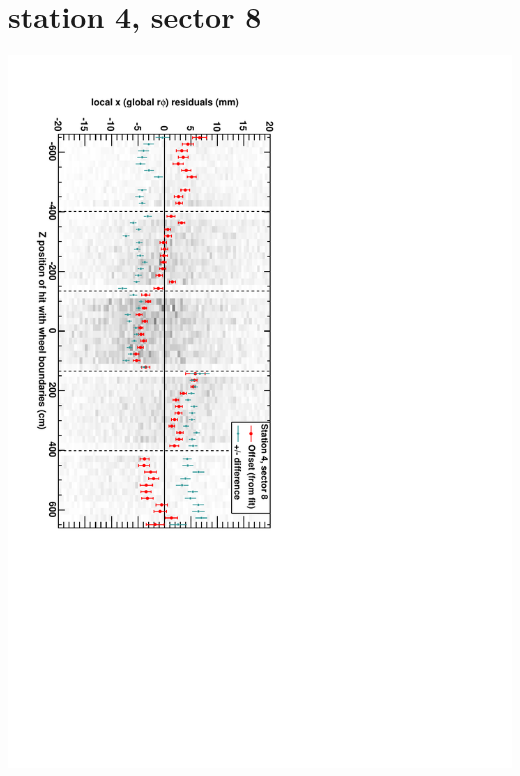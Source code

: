 \documentclass[compress]{beamer}
\begin{document}
\section*{station 4, sector 8}
\begin{frame} \vfill \mbox{\hspace{-1 cm}\includegraphics[height=1.2\linewidth, angle=90]{DTrphiVsZ_st4_sr08.pdf}} \end{frame}
\end{document}
